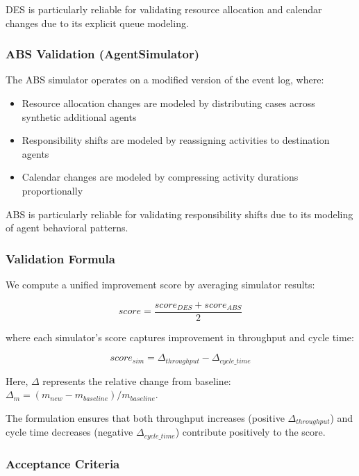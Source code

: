 \documentclass[preprint,12pt]{elsarticle}
\begin{document}
DES is particularly reliable for validating resource allocation and calendar changes due to its explicit queue modeling.

\subsubsection{ABS Validation (AgentSimulator)}

The ABS simulator operates on a modified version of the event log, where:
\begin{itemize}
    \item Resource allocation changes are modeled by distributing cases across synthetic additional agents
    \item Responsibility shifts are modeled by reassigning activities to destination agents
    \item Calendar changes are modeled by compressing activity durations proportionally
\end{itemize}

ABS is particularly reliable for validating responsibility shifts due to its modeling of agent behavioral patterns.

\subsubsection{Validation Formula}

We compute a unified improvement score by averaging simulator results:

\begin{equation}
\label{eq:score}
score = \frac{score_{DES} + score_{ABS}}{2}
\end{equation}

where each simulator's score captures improvement in throughput and cycle time:

\begin{equation}
\label{eq:simulator_score}
score_{sim} = \Delta_{throughput} - \Delta_{cycle\_time}
\end{equation}

Here, $\Delta$ represents the relative change from baseline: $\Delta_m = (m_{new} - m_{baseline}) / m_{baseline}$.

The formulation ensures that both throughput increases (positive $\Delta_{throughput}$) and cycle time decreases (negative $\Delta_{cycle\_time}$) contribute positively to the score.

\subsubsection{Acceptance Criteria}
\end{document}
